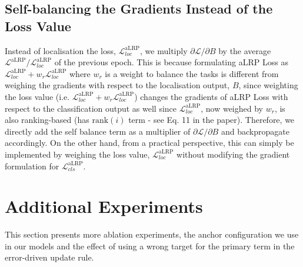 \documentclass{article}
\begin{document}
\subsection{Self-balancing the Gradients Instead of the Loss Value}
Instead of localisation the loss, $\mathcal{L}^{\mathrm{aLRP}}_{loc}$, we multiply ${\partial \mathcal{L}}/{\partial B}$ by the average $\mathcal{L}^{\mathrm{aLRP}}/\mathcal{L}^{\mathrm{aLRP}}_{loc}$ of the previous epoch. This is because formulating aLRP Loss as $\mathcal{L}^{\mathrm{aLRP}}_{loc}+ w_r \mathcal{L}^{\mathrm{aLRP}}_{loc}$ where $w_r$ is a weight to balance the tasks is different from weighing the gradients with respect to the localisation output, $B$, since weighting the loss value (i.e. $\mathcal{L}^{\mathrm{aLRP}}_{loc}+ w_r \mathcal{L}^{\mathrm{aLRP}}_{loc}$) changes the gradients of aLRP Loss with respect to the classification output as well since $\mathcal{L}^{\mathrm{aLRP}}_{loc}$, now weighed by $w_r$, is also ranking-based (has $\mathrm{rank}(i)$ term - see Eq. 11 in the paper). Therefore, we directly add the self balance term as a multiplier of ${\partial \mathcal{L}}/{\partial B}$ and backpropagate accordingly. On the other hand, from a practical perspective, this can simply be implemented by weighing the loss value, $\mathcal{L}^{\mathrm{aLRP}}_{loc}$ without modifying the gradient formulation for $\mathcal{L}^{\mathrm{aLRP}}_{cls}$.
 \section{Additional Experiments}
This section presents more ablation experiments, the anchor configuration we use in our models and the effect of using a wrong target for the primary term in the error-driven update rule.
\end{document}
